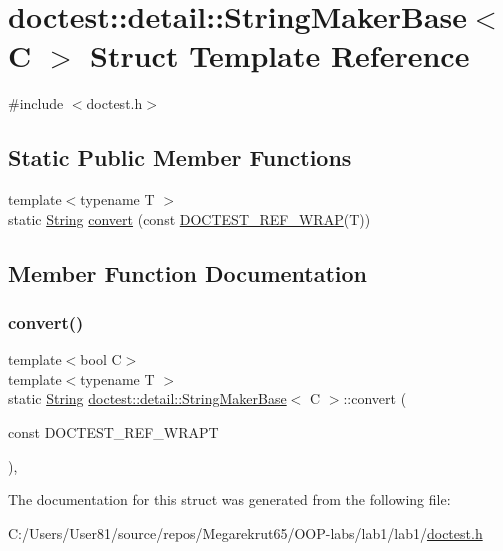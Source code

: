 \hypertarget{structdoctest_1_1detail_1_1_string_maker_base}{}\section{doctest\+:\+:detail\+:\+:String\+Maker\+Base$<$ C $>$ Struct Template Reference}
\label{structdoctest_1_1detail_1_1_string_maker_base}


{\ttfamily \#include $<$doctest.\+h$>$}

\subsection*{Static Public Member Functions}
\begin{DoxyCompactItemize}
\item 
{\footnotesize template$<$typename T $>$ }\\static \mbox{\hyperlink{classdoctest_1_1_string}{String}} \mbox{\hyperlink{structdoctest_1_1detail_1_1_string_maker_base_a67d29f2a5de9a522d8e8607c1a39db9b}{convert}} (const \mbox{\hyperlink{doctest_8h_af2901cafb023c57fb672ccb1bf14f2eb}{D\+O\+C\+T\+E\+S\+T\+\_\+\+R\+E\+F\+\_\+\+W\+R\+AP}}(T))
\end{DoxyCompactItemize}


\subsection{Member Function Documentation}
\mbox{\label{structdoctest_1_1detail_1_1_string_maker_base_a67d29f2a5de9a522d8e8607c1a39db9b}} 
\subsubsection{\texorpdfstring{convert()}{convert()}}
{\footnotesize\ttfamily template$<$bool C$>$ \\
template$<$typename T $>$ \\
static \mbox{\hyperlink{classdoctest_1_1_string}{String}} \mbox{\hyperlink{structdoctest_1_1detail_1_1_string_maker_base}{doctest\+::detail\+::\+String\+Maker\+Base}}$<$ C $>$\+::convert (\begin{DoxyParamCaption}\item[{const }]{D\+O\+C\+T\+E\+S\+T\+\_\+\+R\+E\+F\+\_\+\+W\+R\+APT }\end{DoxyParamCaption})\hspace{0.3cm}{\ttfamily [inline]}, {\ttfamily [static]}}



The documentation for this struct was generated from the following file\+:\begin{DoxyCompactItemize}
\item 
C\+:/\+Users/\+User81/source/repos/\+Megarekrut65/\+O\+O\+P-\/labs/lab1/lab1/\mbox{\hyperlink{doctest_8h}{doctest.\+h}}\end{DoxyCompactItemize}

